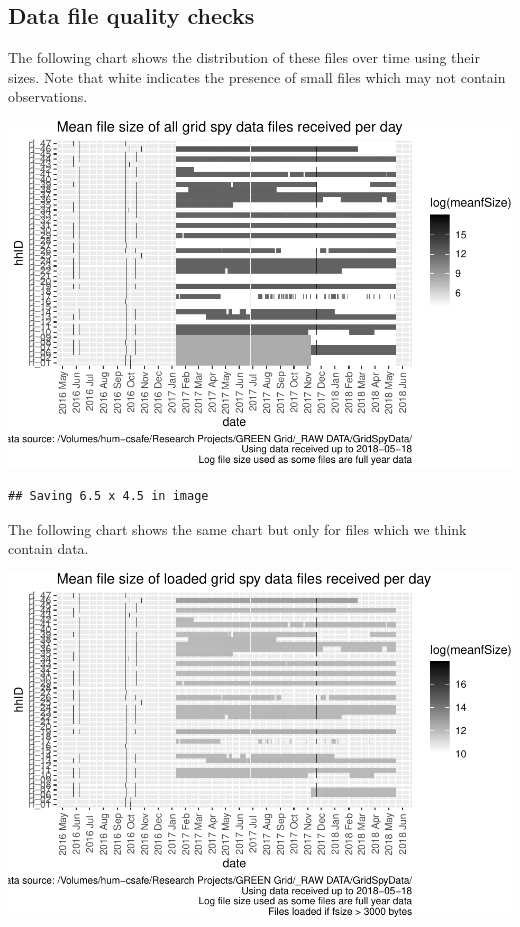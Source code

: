 \documentclass[]{article}
\begin{document}
\subsection{Data file quality checks}\label{data-file-quality-checks}

The following chart shows the distribution of these files over time
using their sizes. Note that white indicates the presence of small files
which may not contain observations.

\includegraphics{processNZGGElecCons1minData_files/figure-latex/allFileSizesPlot-1.pdf}

\begin{verbatim}
## Saving 6.5 x 4.5 in image
\end{verbatim}

The following chart shows the same chart but only for files which we
think contain data.

\includegraphics{processNZGGElecCons1minData_files/figure-latex/loadedFileSizesPlot-1.pdf}
\end{document}
